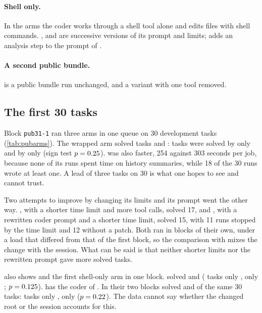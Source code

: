 \paragraph{Shell only.} In the  arms the coder works through a shell tool alone and edits files with shell commands.
,  and  are successive versions of its prompt and limits;  adds an analysis step
to the prompt of .

\paragraph{A second public bundle.}  is a public bundle \citep{idris2026runs} run unchanged, and
 a variant with one tool removed.



\subsection{The first 30 tasks}

Block \texttt{pub31-1} ran three arms in one queue on 30 development tasks (\cref{tab:pubarms}). The wrapped arm
 solved \PairDW{} tasks and  \PairDBf: \PairDOnlyW{} tasks were solved by  only and
\PairDOnlyBf{} by  only (sign test $p = 0.25$).  was also faster, 254 against 303 seconds per job,
because none of its runs spent time on history summaries, while 18 of the 30  runs wrote at least one.
A lead of three tasks on 30 is what one hopes to see and cannot trust.

Two attempts to improve  by changing its limits and its prompt went the other way. , with a shorter
time limit and more tool calls, solved 17, and , with a rewritten coder prompt and a shorter time limit,
solved 15, with 11 runs stopped by the time limit and 12 without a patch. Both ran in blocks of their own, under a load
that differed from that of the first block, so the comparison with  mixes the change with the session. What can
be said is that neither shorter limits nor the rewritten prompt gave more solved tasks.

 also shows  and the first shell-only arm in one block.  solved \PairASh{} and
 \PairAWthree{} (\PairAOnlySh{} tasks only , \PairAOnlyW{} only ; $p = 0.125$).  has
the coder of . In their two blocks  solved \PairAWthree{} and  \PairDW{} of the same 30 tasks:
\CoderOnlyFirst{} tasks only , \CoderOnlySecond{} only  ($p = 0.22$). The data cannot say whether
the changed root or the session accounts for this.

